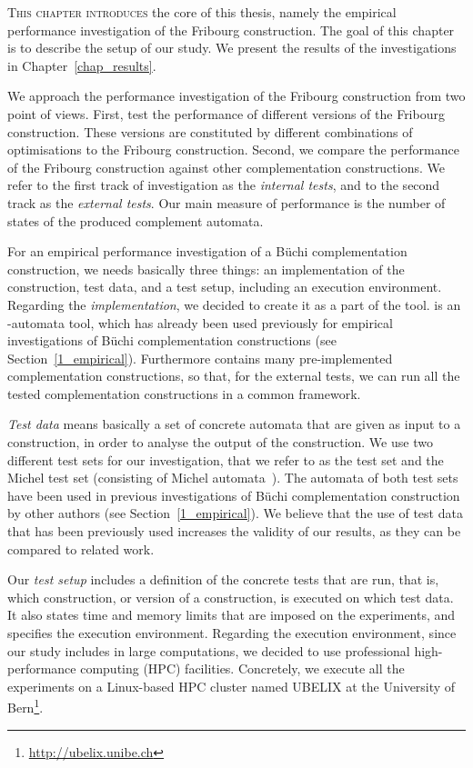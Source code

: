 \lettrine{T}{his chapter introduces} the core of this thesis, namely the empirical performance investigation of the Fribourg construction. The goal of this chapter is to describe the setup of our study. We present the results of the investigations in Chapter~\ref{chap_results}.

We approach the performance investigation of the Fribourg construction from two point of views. First, test the performance of different versions of the Fribourg construction. These versions are constituted by different combinations of optimisations to the Fribourg construction. Second, we compare the performance of the Fribourg construction against other complementation constructions. We refer to the first track of investigation as the \textit{internal tests}, and to the second track as the \textit{external tests}. Our main measure of performance is the number of states of the produced complement automata.

For an empirical performance investigation of a Büchi complementation construction, we needs basically three things: an implementation of the construction, test data, and a test setup, including an execution environment. Regarding the \textit{implementation}, we decided to create it as a part of the \goal{} tool. \goal{} is an \om-automata tool, which has already been used previously for empirical investigations of Büchi complementation constructions (see Section~\ref{1_empirical}). Furthermore \goal{} contains many pre-implemented complementation constructions, so that, for the external tests, we can run all the tested complementation constructions in a common framework.

\textit{Test data} means basically a set of concrete automata that are given as input to a construction, in order to analyse the output of the construction. We use two different test sets for our investigation, that we refer to as the \goal{} test set and the Michel test set (consisting of Michel automata~\cite{michel1988}). The automata of both test sets have been used in previous investigations of Büchi complementation construction by other authors (see Section~\ref{1_empirical}). We believe that the use of test data that has been previously used increases the validity of our results, as they can be compared to related work.

Our \textit{test setup} includes a definition of the concrete tests that are run, that is, which construction, or version of a construction, is executed on which test data. It also states time and memory limits that are imposed on the experiments, and specifies the execution environment. Regarding the execution environment, since our study includes in large computations, we decided to use professional high-performance computing (HPC) facilities. Concretely, we execute all the experiments on a Linux-based HPC cluster named UBELIX at the University of Bern\footnote{\url{http://ubelix.unibe.ch}}.

